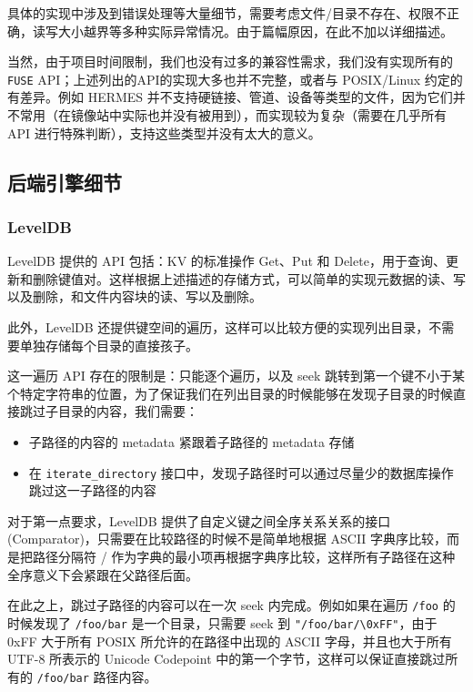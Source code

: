 \documentclass{ctexart}
\begin{document}
具体的实现中涉及到错误处理等大量细节，需要考虑文件/目录不存在、权限不正确，读写大小越界等多种实际异常情况。由于篇幅原因，在此不加以详细描述。

当然，由于项目时间限制，我们也没有过多的兼容性需求，我们没有实现所有的 \texttt{FUSE} API；上述列出的API的实现大多也并不完整，或者与 POSIX/Linux 约定的有差异。例如 HERMES 并不支持硬链接、管道、设备等类型的文件，因为它们并不常用（在镜像站中实际也并没有被用到），而实现较为复杂（需要在几乎所有 API 进行特殊判断），支持这些类型并没有太大的意义。

\subsection{后端引擎细节}

\subsubsection{LevelDB}
LevelDB 提供的 API 包括：KV 的标准操作 Get、Put 和 Delete，用于查询、更新和删除键值对。这样根据上述描述的存储方式，可以简单的实现元数据的读、写以及删除，和文件内容块的读、写以及删除。

此外，LevelDB 还提供键空间的遍历，这样可以比较方便的实现列出目录，不需要单独存储每个目录的直接孩子。

这一遍历 API 存在的限制是：只能逐个遍历，以及 seek 跳转到第一个键不小于某个特定字符串的位置，为了保证我们在列出目录的时候能够在发现子目录的时候直接跳过子目录的内容，我们需要：

\begin{itemize}
    \item 子路径的内容的 metadata 紧跟着子路径的 metadata 存储
    \item 在 \texttt{iterate\_directory} 接口中，发现子路径时可以通过尽量少的数据库操作跳过这一子路径的内容
\end{itemize}

对于第一点要求，LevelDB 提供了自定义键之间全序关系关系的接口 (Comparator)，只需要在比较路径的时候不是简单地根据 ASCII 字典序比较，而是把路径分隔符 / 作为字典的最小项再根据字典序比较，这样所有子路径在这种全序意义下会紧跟在父路径后面。

在此之上，跳过子路径的内容可以在一次 seek 内完成。例如如果在遍历 \texttt{/foo} 的时候发现了 \texttt{/foo/bar} 是一个目录，只需要 seek 到 \texttt{"/foo/bar/\textbackslash{}0xFF"}，由于 0xFF 大于所有 POSIX 所允许的在路径中出现的 ASCII 字母，并且也大于所有 UTF-8 所表示的 Unicode Codepoint 中的第一个字节，这样可以保证直接跳过所有的 \texttt{/foo/bar} 路径内容。
\end{document}

